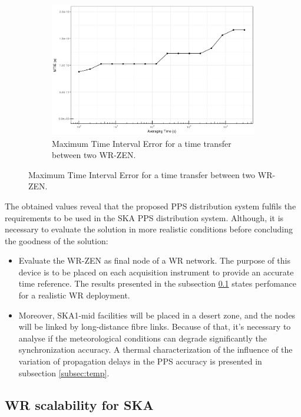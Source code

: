 \begin{figure}
	\begin{subfigure}[t]{0.48\textwidth}
		\includegraphics[width=\textwidth]{img/MTIE_exp1}
		\caption[MTIE plot for the WR-ZEN]{Maximum Time Interval Error for a 
		time transfer between two WR-ZEN.}
		\label{fig:mtie_exp1}
	\end{subfigure}
\end{figure}

The obtained values reveal that the proposed PPS distribution system fulfils 
the requirements to be used in the SKA PPS distribution system. Although, it is 
necessary to evaluate the solution in more realistic conditions before 
concluding the goodness of the solution:

\begin{itemize}
	\item Evaluate the WR-ZEN as final node of a WR network. The purpose of 
	this device is to be placed on each acquisition instrument to provide an 
	accurate time reference. The results presented in the subsection 
	\ref{subsec: net_exp} states perfomance for a realistic WR deployment.
	
	\item Moreover, SKA1-mid facilities will be placed in a desert zone, and 
	the nodes will be linked by long-distance fibre links. Because of that, 
	it's 
	necessary to analyse if the meteorological conditions can degrade 
	significantly the synchronization accuracy. A thermal characterization of 
	the influence of the variation of propagation delays in the PPS accuracy is 
	presented in subsection \ref{subsec:temp}.
\end{itemize}   

\subsection{WR scalability for SKA} %
\label{subsec: net_exp}

